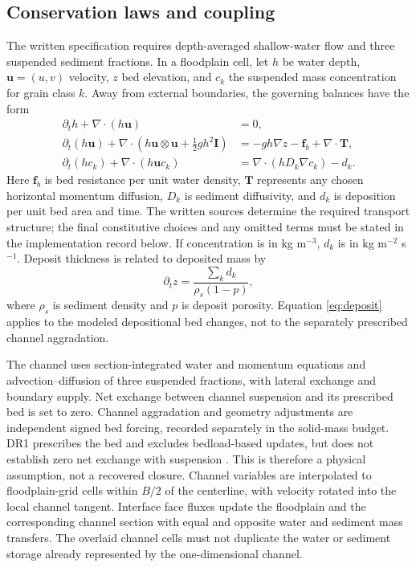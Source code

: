 \documentclass[11pt]{article}
\begin{document}
\subsection{Conservation laws and coupling}
The written specification requires depth-averaged shallow-water flow and
three suspended sediment fractions. In a floodplain cell, let $h$ be water
depth, $\mathbf{u}=(u,v)$ velocity, $z$ bed elevation, and $c_k$ the suspended
mass concentration for grain class $k$. Away from external boundaries,
the governing balances have the form
\begin{align}
 \partial_t h+\nabla\cdot(h\mathbf{u}) &= 0, \\
 \partial_t(h\mathbf{u})+
 \nabla\cdot\left(h\mathbf{u}\otimes\mathbf{u}
                   +\tfrac12 gh^2\mathbf{I}\right)
 &= -gh\nabla z-\mathbf{f}_b+\nabla\cdot\mathbf{T}, \label{eq:momentum}\\
 \partial_t(hc_k)+\nabla\cdot(h\mathbf{u}c_k)
 &= \nabla\cdot(hD_k\nabla c_k)-d_k . \label{eq:sediment}
\end{align}
Here $\mathbf{f}_b$ is bed resistance per unit water density,
$\mathbf{T}$ represents any chosen horizontal momentum diffusion,
$D_k$ is sediment diffusivity, and $d_k$ is deposition per unit bed area
and time. The written sources determine the required transport structure;
the final constitutive choices and any omitted terms must be stated in the
implementation record below. If concentration is in kg m$^{-3}$, $d_k$ is
in kg m$^{-2}$ s$^{-1}$. Deposit thickness is related to deposited mass by
\begin{equation}
 \partial_t z=\frac{\sum_k d_k}{\rho_s(1-p)},
 \label{eq:deposit}
\end{equation}
where $\rho_s$ is sediment density and $p$ is deposit porosity. Equation
\eqref{eq:deposit} applies to the modeled depositional bed changes, not to
the separately prescribed channel aggradation.

The channel uses section-integrated water and momentum equations and
advection--diffusion of three suspended fractions, with lateral exchange
and boundary supply. Net exchange between channel suspension and its
prescribed bed is set to zero. Channel aggradation and geometry adjustments
are independent signed bed forcing, recorded separately in the solid-mass
budget. DR1 prescribes the bed and excludes bedload-based updates, but does
not establish zero net exchange with suspension \cite{supplement}.
This is therefore a physical assumption, not a recovered closure.
Channel variables are interpolated to floodplain-grid cells within
$B/2$ of the centerline, with velocity rotated into the local channel tangent.
Interface face fluxes update the floodplain and the corresponding channel
section with equal and opposite water and sediment mass transfers. The
overlaid channel cells must not duplicate the water or sediment storage
already represented by the one-dimensional channel.
\end{document}
